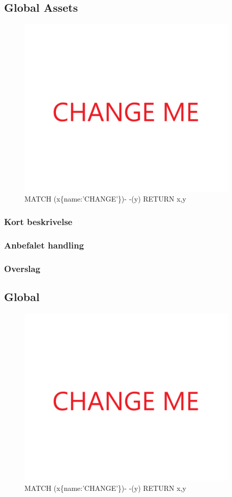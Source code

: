 \documentclass{article}
\begin{document}
\subsection{Global Assets}
\begin{figure}[h]
\includegraphics[width=300pt]{CHANGE.PNG}
\caption{MATCH (x\{name:'CHANGE'\})- -(y) RETURN x,y}
\end{figure}
\subsubsection{Kort beskrivelse}
\subsubsection{Anbefalet handling}
\subsubsection{Overslag}


\subsection{Global}
\begin{figure}[h]
\includegraphics[width=300pt]{CHANGE.PNG}
\caption{MATCH (x\{name:'CHANGE'\})- -(y) RETURN x,y}
\end{figure}
\end{document}

